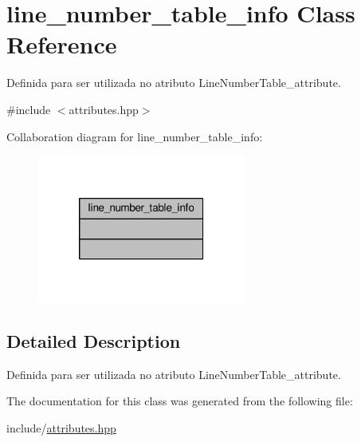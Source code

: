 \hypertarget{classline__number__table__info}{\section{line\+\_\+number\+\_\+table\+\_\+info Class Reference}
\label{classline__number__table__info}
}


Definida para ser utilizada no atributo Line\+Number\+Table\+\_\+attribute.  




{\ttfamily \#include $<$attributes.\+hpp$>$}



Collaboration diagram for line\+\_\+number\+\_\+table\+\_\+info\+:\nopagebreak
\begin{figure}[H]
\begin{center}
\leavevmode
\includegraphics[width=194pt]{classline__number__table__info__coll__graph}
\end{center}
\end{figure}


\subsection{Detailed Description}
Definida para ser utilizada no atributo Line\+Number\+Table\+\_\+attribute. 

The documentation for this class was generated from the following file\+:\begin{DoxyCompactItemize}
\item 
include/\hyperlink{attributes_8hpp}{attributes.\+hpp}\end{DoxyCompactItemize}
